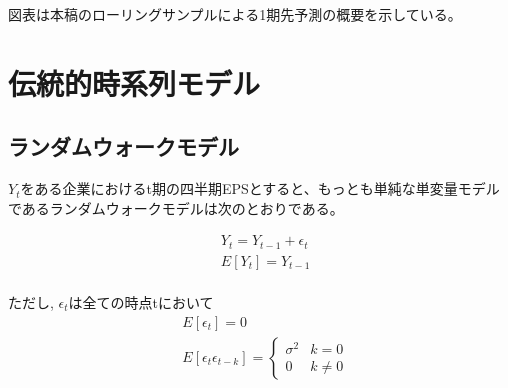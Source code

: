 \documentclass[a4paper, 12pt]{jsreport}
\begin{document}
図表は本稿のローリングサンプルによる1期先予測の概要を示している。


\section{伝統的時系列モデル}

\subsection{ランダムウォークモデル}

$Y_t$をある企業におけるt期の四半期EPSとすると、もっとも単純な単変量モデルであるランダムウォークモデルは次のとおりである。

\begin{equation}
  \begin{split}
    & Y_t = Y_{t-1} + \epsilon_t \\
    & E[Y_t] = Y_{t-1} \\
  \end{split}
\end{equation}        


ただし, $\epsilon_t$は全ての時点tにおいて
\begin{equation}
  \begin{split}
    & E[\epsilon_t] = 0 \\
    & E[\epsilon_t \epsilon_{t-k}] = \left\{
      \begin{array}{ll}
        \sigma^2 & k=0 \\
        0 & k \neq 0
      \end{array}\right. \\
  \end{split}
\end{equation}    
\end{document}
